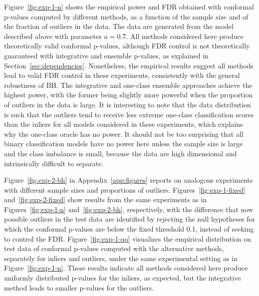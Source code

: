 \documentclass[11pt]{article}
\begin{document}
Figure~\ref{fig:exp-1-n} shows the empirical power and FDR obtained with conformal p-values computed by different methods, as a function of the sample size and of the fraction of outliers in the data. The data are generated from the model described above with parameter $a=0.7$.
All methods considered here produce theoretically valid conformal p-values, although FDR control is not theoretically guaranteed with integrative and ensemble p-values, as explained in Section~\ref{sec:dependencies}. Nonetheless, the empirical results suggest all methods lead to valid FDR control in these experiments, consistently with the general robustness of BH. 
The integrative and one-class ensemble approaches achieve the highest power, with the former being slightly more powerful when the proportion of outliers in the data is large.
It is interesting to note that the data distribution is such that the outliers tend to receive less extreme one-class classification scores than the inliers for all models considered in these experiments, which explains why the one-class oracle has no power.
It should not be too surprising that all binary classification models have no power here unless the sample size is large and the class imbalance is small, because the data are high dimensional and intrinsically difficult to separate.

Figure~\ref{fig:exp-2-bh} in Appendix~\ref{app:figures} reports on analogous experiments with different sample sizes and proportions of outliers.
Figures~\ref{fig:exp-1-fixed} and~\ref{fig:exp-2-fixed} show results from the same experiments as in Figures~\ref{fig:exp-1-n} and~\ref{fig:exp-2-bh}, respectively, with the difference that now possible outliers in the test data are identified by rejecting the null hypotheses for which the conformal p-values are below the fixed threshold 0.1, instead of seeking to control the FDR.
Figure~\ref{fig:exp-1-qq} visualizes the empirical distribution on test data of conformal p-values computed with the alternative methods, separately for inliers and outliers, under the same experimental setting as in Figure~\ref{fig:exp-1-n}. These results indicate all methods considered here produce uniformly distributed p-values for the inliers, as expected, but the integrative method leads to smaller p-values for the outliers.
\end{document}
